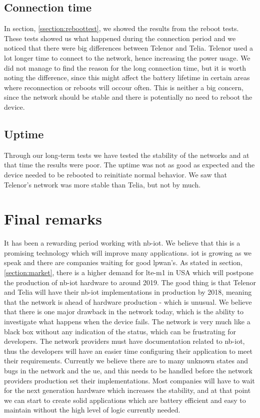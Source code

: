 \documentclass[USenglish]{ifimaster}  %
\begin{document}
\subsection{Connection time}
In section, \vref{ssection:reboottest}, we showed the results from the reboot tests. These tests showed us what happened during the connection period and we noticed that there were big differences between Telenor and Telia. Telenor used a lot longer time to connect to the network, hence increasing the power usage. We did not manage to find the reason for the long connection time, but it is worth noting the difference, since this might affect the battery lifetime in certain areas where reconnection or reboots will occour often. This is neither a big concern, since the network should be stable and there is potentially no need to reboot the device.

\subsection{Uptime}
Through our long-term tests we have tested the stability of the networks and at that time the results were poor. The uptime was not as good as expected and the device needed to be rebooted to reinitiate normal behavior. We saw that Telenor's network was more stable than Telia, but not by much.

\section{Final remarks}
It has been a rewarding period working with \acrshort{nb-iot}. We believe that this is a promising technology which will improve many applications. \acrshort{iot} is growing as we speak and there are companies waiting for good \acrshort{lpwan}'s. As stated in section, \vref{section:market}, there is a higher demand for \acrshort{lte-m1} in USA which will postpone the production of \acrshort{nb-iot} hardware to around 2019. The good thing is that Telenor and Telia will have their \acrshort{nb-iot} implementations in production by 2018, meaning that the network is ahead of hardware production - which is unusual. We believe that there is one major drawback in the network today, which is the ability to investigate what happens when the device fails. The network is very much like a black box without any indication of the status, which can be frustrating for developers. The network providers must have documentation related to \acrshort{nb-iot}, thus the developers will have an easier time configuring their application to meet their requirements. Currently we believe there are to many unknown states and bugs in the network and the \acrshort{ue}, and this needs to be handled before the network providers production set their implementations. Most companies will have to wait for the next generation hardware which increases the stability, and at that point we can start to create solid applications which are battery efficient and easy to maintain without the high level of logic currently needed.

\backmatter{}
\printbibliography[title={Bibliography}]
\printglossary[type=\acronymtype]
\end{document}
